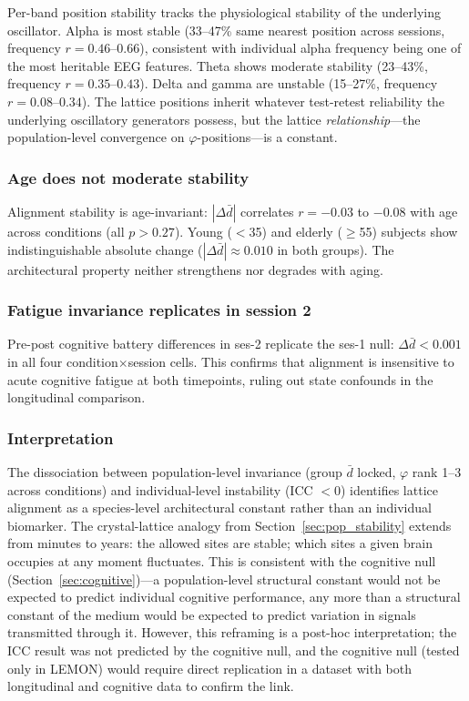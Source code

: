 \documentclass[11pt,a4paper]{article}
\newcommand{\phisym}{\varphi}
\begin{document}
Per-band position stability tracks the physiological stability of the underlying oscillator. Alpha is most stable (33--47\% same nearest position across sessions, frequency $r = 0.46$--$0.66$), consistent with individual alpha frequency being one of the most heritable EEG features. Theta shows moderate stability (23--43\%, frequency $r = 0.35$--$0.43$). Delta and gamma are unstable (15--27\%, frequency $r = 0.08$--$0.34$). The lattice positions inherit whatever test-retest reliability the underlying oscillatory generators possess, but the lattice \textit{relationship}---the population-level convergence on $\phisym$-positions---is a constant.

\subsubsection{Age does not moderate stability}

Alignment stability is age-invariant: $|\Delta\bar{d}|$ correlates $r = -0.03$ to $-0.08$ with age across conditions (all $p > 0.27$). Young ($<$35) and elderly ($\geq$55) subjects show indistinguishable absolute change ($|\Delta\bar{d}| \approx 0.010$ in both groups). The architectural property neither strengthens nor degrades with aging.

\subsubsection{Fatigue invariance replicates in session 2}

Pre-post cognitive battery differences in ses-2 replicate the ses-1 null: $\Delta\bar{d} < 0.001$ in all four condition$\times$session cells. This confirms that alignment is insensitive to acute cognitive fatigue at both timepoints, ruling out state confounds in the longitudinal comparison.

\subsubsection{Interpretation}

The dissociation between population-level invariance (group $\bar{d}$ locked, $\phisym$ rank 1--3 across conditions) and individual-level instability (ICC $< 0$) identifies lattice alignment as a species-level architectural constant rather than an individual biomarker. The crystal-lattice analogy from Section~\ref{sec:pop_stability} extends from minutes to years: the allowed sites are stable; which sites a given brain occupies at any moment fluctuates. This is consistent with the cognitive null (Section~\ref{sec:cognitive})---a population-level structural constant would not be expected to predict individual cognitive performance, any more than a structural constant of the medium would be expected to predict variation in signals transmitted through it. However, this reframing is a post-hoc interpretation; the ICC result was not predicted by the cognitive null, and the cognitive null (tested only in LEMON) would require direct replication in a dataset with both longitudinal and cognitive data to confirm the link.
\end{document}
